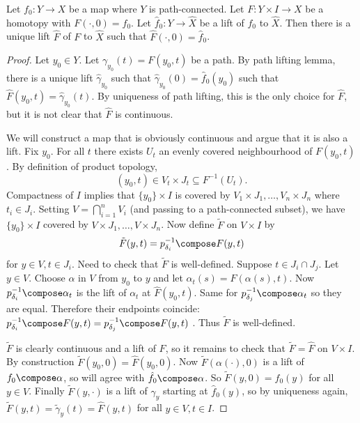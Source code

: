 \documentclass[a4paper]{article}
\begin{document}
\begin{lemma}
  \label{lem:homotopy lifting lemma}
  Let \(f_0: Y \to X\) be a map where \(Y\) is path-connected. Let \(F: Y \times I \to X\) be a homotopy with \(F(\cdot, 0) = f_0\). Let \(\hat f_0: Y \to \hat X\) be a lift of \(f_0\) to \(\hat X\). Then there is a unique lift \(\hat F\) of \(F\) to \(\hat X\) such that \(\hat F(\cdot, 0) = \hat f_0\).
\end{lemma}

\begin{proof}
  Let \(y_0 \in Y\). Let \(\gamma_{y_0}(t) = F(y_0, t)\) be a path. By path lifting lemma, there is a unique lift \(\hat \gamma_{y_0}\) such that \(\hat \gamma_{y_0}(0) = \hat f_0(y_0)\) such that \(\hat F(y_0, t) = \hat\gamma_{y_0}(t)\). By uniqueness of path lifting, this is the only choice for \(\hat F\), but it is not clear that \(\hat F\) is continuous.

  We will construct a map that is obviously continuous and argue that it is also a lift. Fix \(y_0\). For all \(t\) there exists \(U_t\) an evenly covered neighbourhood of \(F(y_0, t)\). By definition of product topology,
  \[
    (y_0, t) \in V_t \times J_t \subseteq F^{-1}(U_t).
  \]
  Compactness of \(I\) implies that \(\{y_0\} \times I\) is covered by \(V_1 \times J_1, \dots, V_n \times J_n\) where \(t_i \in J_i\). Setting \(V = \bigcap_{i = 1}^n V_i\) (and passing to a path-connected subset), we have \(\{y_0\} \times I\) covered by \(V \times J_1, \dots, V \times J_n\). Now define \(\tilde F\) on \(V \times I\) by
  \[
    \tilde F(y, t) = p_{\delta_i}^{-1} \compose F(y, t)
  \]
  for \(y \in V, t \in J_i\). Need to check that \(\tilde F\) is well-defined. Suppose \(t \in J_i \cap J_j\). Let \(y \in V\). Choose \(\alpha\) in \(V\) from \(y_0\) to \(y\) and let \(\alpha_t(s) = F(\alpha(s), t)\). Now \(p_{\delta_i}^{-1} \compose \alpha_t\) is the lift of \(\alpha_t\) at \(\hat F(y_0, t)\). Same for \(p_{\delta_j}^{-1} \compose \alpha_t\) so they are equal. Therefore their endpoints coincide: \(p_{\delta_i}^{-1} \compose F(y, t) = p_{\delta_j}^{-1} \compose F(y, t)\) . Thus \(\tilde F\) is well-defined.

  \(\tilde F\) is clearly continuous and a lift of \(F\), so it remains to check that \(\tilde F = \hat F\) on \(V \times I\). By construction \(\tilde F(y_0, 0) = \hat F(y_0, 0)\). Now \(\tilde F(\alpha(\cdot), 0)\) is a lift of \(f_0 \compose \alpha\), so will agree with \(\hat f_0 \compose \alpha\). So \(\tilde F(y, 0) = \hat f_0(y)\) for all \(y \in V\). Finally \(\tilde F(y, \cdot)\) is a lift of \(\gamma_y\) starting at \(\hat f_0(y)\), so by uniqueness again, \(\tilde F(y, t) = \tilde \gamma_y(t) = \hat F(y, t)\) for all \(y \in V, t \in I\).
\end{proof}
\end{document}
